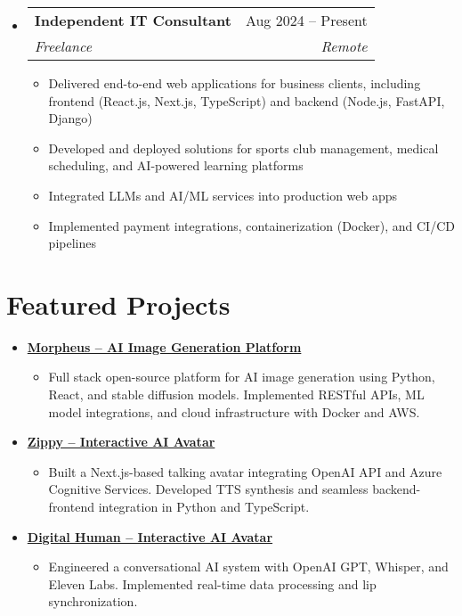 \documentclass[letterpaper,11pt]{article}
\makeatletter
\newcommand{\resumeSubheading}[4]{
  \vspace{-2pt}
  \item[]
  \begin{tabular*}{\textwidth}{@{\extracolsep{\fill}}l r}
    \textbf{#1} & #2 \\
    \textit{#3} & \textit{#4} \\
  \end{tabular*}
  \vspace{-5pt}
}
\newcommand{\normalfaExternalLink}{{\mdseries\faExternalLink}}
\makeatother
\begin{document}
\begin{itemize}[leftmargin=0pt, itemindent=0pt, label={}]
\resumeSubheading
{Independent IT Consultant}{Aug 2024 -- Present}
{Freelance}{Remote}
\begin{itemize}[leftmargin=*]
    \item Delivered end-to-end web applications for business clients, including frontend (React.js, Next.js, TypeScript) and backend (Node.js, FastAPI, Django)
    \item Developed and deployed solutions for sports club management, medical scheduling, and AI-powered learning platforms
    \item Integrated LLMs and AI/ML services into production web apps
    \item Implemented payment integrations, containerization (Docker), and CI/CD pipelines
\end{itemize}
\end{itemize}
\newpage
\section{Featured Projects}
\begin{itemize}[leftmargin=*]
    \item \textbf{\href{https://github.com/Monadical-SAS/Morpheus}{Morpheus -- AI Image Generation Platform \normalfaExternalLink}}
    \begin{itemize}
        \item Full stack open-source platform for AI image generation using Python, React, and stable diffusion models. Implemented RESTful APIs, ML model integrations, and cloud infrastructure with Docker and AWS.
    \end{itemize}
    \item \textbf{\href{https://github.com/asanchezyali/ai-avatar}{Zippy -- Interactive AI Avatar \normalfaExternalLink}}
    \begin{itemize}
        \item Built a Next.js-based talking avatar integrating OpenAI API and Azure Cognitive Services. Developed TTS synthesis and seamless backend-frontend integration in Python and TypeScript.
    \end{itemize}
    \item \textbf{\href{https://github.com/asanchezyali/talking-avatar-with-ai}{Digital Human -- Interactive AI Avatar \normalfaExternalLink}}
    \begin{itemize}
        \item Engineered a conversational AI system with OpenAI GPT, Whisper, and Eleven Labs. Implemented real-time data processing and lip synchronization.
    \end{itemize}
\end{itemize}
\end{document}
